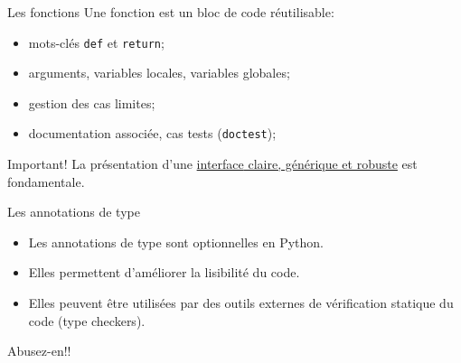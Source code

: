 \documentclass[dvipsnames]{beamer}
\begin{document}
\begin{frame}
    [fragile]{Les fonctions}
    Une fonction est un bloc de code réutilisable:
    \begin{itemize}
        \item mots-clés \texttt{\small def} et \texttt{\small return};
        \item arguments, variables locales, variables globales;
        \item gestion des cas limites;
        \item documentation associée, cas tests (\texttt{\small doctest});
    \end{itemize}

    \begin{alertblock}
        {Important!}
        \vspace{.5em}
        La présentation d'une \alert{\underline{{interface}
                \normalfont\color{black} claire, générique et
                robuste}} est fondamentale.
    \end{alertblock}
\end{frame}


\begin{frame}[fragile]{Les annotations de type}
    \begin{itemize}
        \item Les annotations de type sont optionnelles en Python.
        \item Elles permettent d'améliorer la lisibilité du code.
        \item Elles peuvent être utilisées par des outils externes de
              vérification statique du code (type checkers).
    \end{itemize}

    Abusez-en!!

\end{frame}
\end{document}
